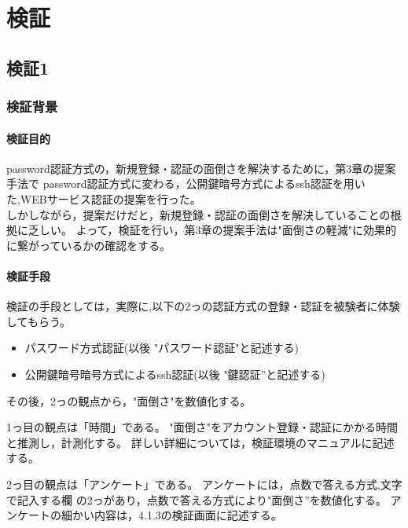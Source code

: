 \chapter{検証}
\label{chap:poordirection}


\section{検証1}

\subsection{検証背景}

\subsubsection{検証目的}

password認証方式の，新規登録・認証の面倒さを解決するために，第3章の提案手法で
password認証方式に変わる，公開鍵暗号方式によるssh認証を用いた,WEBサービス認証の提案を行った。\\
しかしながら，提案だけだと，新規登録・認証の面倒さを解決していることの根拠に乏しい。
よって，検証を行い，第3章の提案手法は"面倒さの軽減"に効果的に繋がっているかの確認をする。


\subsubsection{検証手段}

検証の手段としては，実際に,以下の2っの認証方式の登録・認証を被験者に体験してもらう。

\begin{itemize}
  \item パスワード方式認証(以後 "パスワード認証"と記述する)
  \item 公開鍵暗号暗号方式によるssh認証(以後 "鍵認証”と記述する)
\end{itemize}
その後，2っの観点から，"面倒さ"を数値化する。

1っ目の観点は「時間」である。
"面倒さ"をアカウント登録・認証にかかる時間と推測し，計測化する。
詳しい詳細については，検証環境のマニュアルに記述する。


2っ目の観点は「アンケート」である。
アンケートには，点数で答える方式,文字で記入する欄 の2っがあり，点数で答える方式により"面倒さ”を数値化する。
アンケートの細かい内容は，4.1.3の検証画面に記述する。

